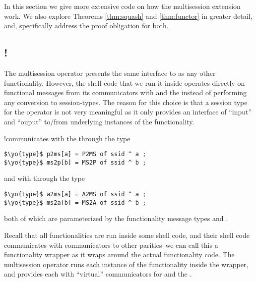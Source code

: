 In this section we give more extensive code on how the multisession extension work. We also explore Theorems \ref{thm:squash} and \ref{thm:functor} in greater detail, and, specifically address the proof obligation for both.

\subsection{!\F}
The multisession operator presents the same interface to  as any other functionality.
However, the shell code that we run it inside operates directly on functional messages from its communicators with \F and the \partywrapper instead of performing any conversion to session-types.
The reason for this choice is that a session type for the operator is not very meaningful as it only provides an interface of ``input'' and ``ouput'' to/from underlying instances of the functionality.

!\F communicates with the \partywrapper through the type
\begin{lstlisting}[basicstyle=\small\BeraMonottFamily, mathescape]
$\yo{type}$ p2ms[a] = P2MS of ssid ^ a ;
$\yo{type}$ ms2p[b] = MS2P of ssid ^ b ;
\end{lstlisting}
and with \A through the type
\begin{lstlisting}[basicstyle=\small\BeraMonottFamily, mathescape]
$\yo{type}$ a2ms[a] = A2MS of ssid ^ a ;
$\yo{type}$ ms2a[b] = MS2A of ssid ^ b ;
\end{lstlisting}
both of which are parameterized by the functionality message types  and .


Recall that all functionalities are run inside some shell code, and their shell code communicates with communicators to other parities--we can call this a functionality wrapper as it wraps around the actual functionality code.
The multisession operator runs each instance of the functionality inside the wrapper, and provides each with ``virtual'' communicators for \A and the \partywrapper.

